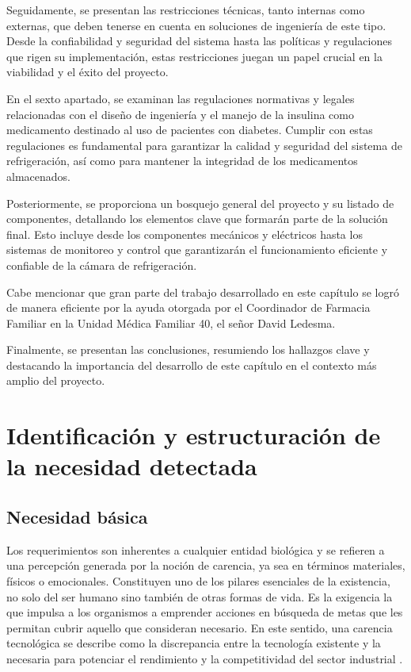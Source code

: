Seguidamente, se presentan las restricciones técnicas, tanto internas como externas, que deben tenerse en cuenta en soluciones de ingeniería de este tipo. Desde la confiabilidad y seguridad del sistema hasta las políticas y regulaciones que rigen su implementación, estas restricciones juegan un papel crucial en la viabilidad y el éxito del proyecto.

En el sexto apartado, se examinan las regulaciones normativas y legales relacionadas con el diseño de ingeniería y el manejo de la insulina como medicamento destinado al uso de pacientes con diabetes. Cumplir con estas regulaciones es fundamental para garantizar la calidad y seguridad del sistema de refrigeración, así como para mantener la integridad de los medicamentos almacenados.

Posteriormente, se proporciona un bosquejo general del proyecto y su listado de componentes, detallando los elementos clave que formarán parte de la solución final. Esto incluye desde los componentes mecánicos y eléctricos hasta los sistemas de monitoreo y control que garantizarán el funcionamiento eficiente y confiable de la cámara de refrigeración.

Cabe mencionar que gran parte del trabajo desarrollado en este capítulo se logró de manera eficiente por la ayuda otorgada por el Coordinador de Farmacia Familiar en la Unidad Médica Familiar 40, el señor David Ledesma.

Finalmente, se presentan las conclusiones, resumiendo los hallazgos clave y destacando la importancia del desarrollo de este capítulo en el contexto más amplio del proyecto. \rsp
\newpage


\section{Identificación y estructuración de la necesidad detectada}\rsp
\subsection{Necesidad básica}
Los requerimientos son inherentes a cualquier entidad biológica y se refieren a una percepción generada por la noción de carencia, ya sea en términos materiales, físicos o emocionales. Constituyen uno de los pilares esenciales de la existencia, no solo del ser humano sino también de otras formas de vida. Es la exigencia la que impulsa a los organismos a emprender acciones en búsqueda de metas que les permitan cubrir aquello que consideran necesario.
En este sentido, una carencia tecnológica se describe como la discrepancia entre la tecnología existente y la necesaria para potenciar el rendimiento y la competitividad del sector industrial \cite{marrelli-2011,imp-2018}.

